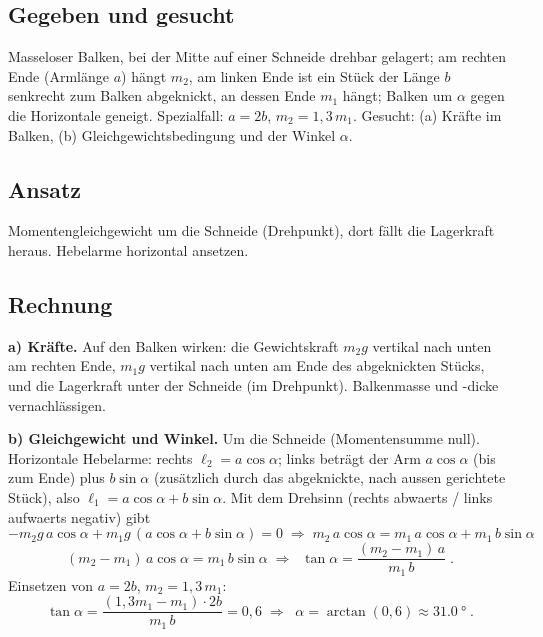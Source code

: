 
\subsection*{Gegeben und gesucht}
Masseloser Balken, bei der Mitte auf einer Schneide drehbar gelagert; am
rechten Ende (Armlänge $a$) hängt $m_2$, am linken Ende ist ein Stück
der Länge $b$ senkrecht zum Balken abgeknickt, an dessen Ende $m_1$
hängt; Balken um $\alpha$ gegen die Horizontale geneigt.
Spezialfall: $a=2b$, $m_2=1,3\,m_1$. Gesucht: (a) Kräfte im Balken,
(b) Gleichgewichtsbedingung und der Winkel $\alpha$.

\subsection*{Ansatz}
Momentengleichgewicht um die Schneide (Drehpunkt), dort fällt die
Lagerkraft heraus. Hebelarme horizontal ansetzen.

\subsection*{Rechnung}
\textbf{a) Kräfte.} Auf den Balken wirken: die Gewichtskraft $m_2g$
vertikal nach unten am rechten Ende, $m_1g$ vertikal nach unten am Ende
des abgeknickten Stücks, und die Lagerkraft unter der Schneide (im
Drehpunkt). Balkenmasse und -dicke vernachlässigen.

\textbf{b) Gleichgewicht und Winkel.} Um die Schneide (Momentensumme
null). Horizontale Hebelarme: rechts $\ell_2=a\cos\alpha$; links beträgt
der Arm $a\cos\alpha$ (bis zum Ende) plus $b\sin\alpha$ (zusätzlich durch
das abgeknickte, nach aussen gerichtete Stück), also
$\ell_1=a\cos\alpha+b\sin\alpha$. Mit dem Drehsinn (rechts abwaerts /
links aufwaerts negativ) gibt
\begin{equation}
  -m_2g\,a\cos\alpha + m_1g\,(a\cos\alpha+b\sin\alpha)=0
  \;\Rightarrow\;
  m_2\,a\cos\alpha = m_1\,a\cos\alpha + m_1\,b\sin\alpha
\end{equation}
\begin{equation}
  (m_2-m_1)\,a\cos\alpha=m_1\,b\sin\alpha
  \;\Rightarrow\;
  \boxed{\;\tan\alpha=\frac{(m_2-m_1)\,a}{m_1\,b}\;}.
\end{equation}
Einsetzen von $a=2b$, $m_2=1,3\,m_1$:
\begin{equation}
  \tan\alpha=\frac{(1,3m_1-m_1)\cdot2b}{m_1\,b}=0,6
  \;\Rightarrow\;
  \boxed{\;\alpha=\arctan(0{,}6)\approx\qty{31.0}{\degree}\;}.
\end{equation}

